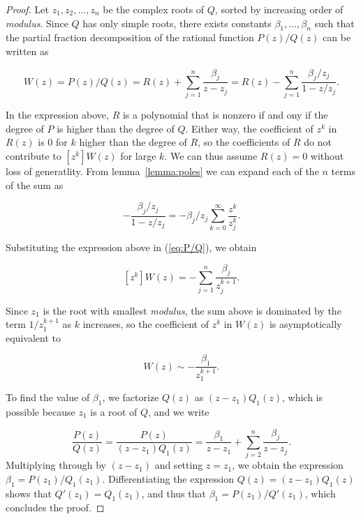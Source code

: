 \documentclass{article}
\begin{document}
\begin{proof}
Let $z_1, z_2, \ldots, z_n$ be the complex roots of $Q$, sorted by
increasing order of \textit{modulus}. Since $Q$ has only simple roots,
there exists constants $\beta_1, \ldots, \beta_n$ such that the partial
fraction decomposition of the rational function $P(z)/Q(z)$ can be written
as

\begin{equation}
\label{eq:P/Q}
W(z) = P(z)/Q(z) = R(z) + \sum_{j=1}^n \frac{\beta_j}{z-z_j} =
R(z) -\sum_{j=1}^n \frac{\beta_j/z_j}{1-z/z_j}.
\end{equation}

In the expression above, $R$ is a polynomial that is nonzero if and ony if
the degree of $P$ is higher than the degree of $Q$. Either way, the
coefficient of $z^k$ in $R(z)$ is $0$ for $k$ higher than the degree of
$R$, so the coefficients of $R$ do not contribute to $[z^k]W(z)$ for
large $k$. We can thus assume $R(z) = 0$ without loss of generatlity. From
lemma~\ref{lemma:poles} we can expand each of the $n$ terms of the sum as

\begin{equation*}
-\frac{\beta_j/z_j}{1-z/z_j} = -\beta_j/z_j
\sum_{k=0}^\infty \frac{z^k}{z_j^k}.
\end{equation*}


Substituting the expression above in (\ref{eq:P/Q}), we obtain

\begin{equation}
\label{eq:fullass}
[z^k]W(z) = -\sum_{j=1}^n \frac{\beta_j}{z_j^{k+1}}.
\end{equation}

Since $z_1$ is the root with smallest \textit{modulus}, the sum above is
dominated by the term $1/z_1^{k+1}$ as $k$ increases, so the coefficient
of $z^k$ in $W(z)$ is asymptotically equivalent to

\begin{equation*}
[z^k]W(z) \sim -\frac{\beta_1}{z_1^{k+1}}.
\end{equation*}

To find the value of $\beta_1$, we factorize $Q(z)$ as
$(z-z_1)Q_1(z)$, which is  possible because $z_1$ is a root of $Q$,
and we write

\begin{equation*}
\frac{P(z)}{Q(z)} =
\frac{P(z)}{(z-z_1)Q_1(z)} = \frac{\beta_1}{z-z_1} +
\sum_{j=2}^n\frac{\beta_j}{z-z_j}.
\end{equation*}
Multiplying through by $(z-z_1)$ and setting $z = z_1$, we obtain the
expression $\beta_1 = P(z_1) / Q_1(z_1)$. Differentiating the expression
$Q(z) = (z-z_1)Q_1(z)$ shows that $Q'(z_1) = Q_1(z_1)$, and thus that
$\beta_1 = P(z_1) / Q'(z_1)$, which concludes the proof.
\end{proof}
\end{document}
